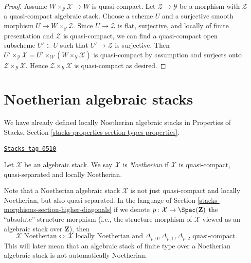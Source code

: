 \begin{proof}
Assume $W \times_\mathcal{Y} \mathcal{X} \to W$ is quasi-compact.
Let $\mathcal{Z} \to \mathcal{Y}$ be a morphism with $\mathcal{Z}$
a quasi-compact algebraic stack. Choose a scheme $U$ and a surjective
smooth morphism
$U \to W \times_\mathcal{Y} \mathcal{Z}$.
Since $U \to \mathcal{Z}$ is flat, surjective, and locally of finite
presentation and $\mathcal{Z}$ is quasi-compact, we can find a
quasi-compact open subscheme $U' \subset U$ such that
$U' \to \mathcal{Z}$ is surjective.
Then
$U' \times_\mathcal{Y} \mathcal{X} =
U' \times_W (W \times_\mathcal{Y} \mathcal{X})$
is quasi-compact by assumption and surjects onto
$\mathcal{Z} \times_\mathcal{Y} \mathcal{X}$.
Hence $\mathcal{Z} \times_\mathcal{Y} \mathcal{X}$
is quasi-compact as desired.
\end{proof}

\section{Noetherian algebraic stacks}
\label{stacks-morphisms-section-noetherian}
We have already defined locally Noetherian algebraic stacks in
Properties of Stacks, Section \ref{stacks-properties-section-types-properties}.

\begin{definition}[Noetherian]
\label{stacks-morphisms-definition-noetherian}
\href{https://stacks.math.columbia.edu/tag/0510}{\texttt{Stacks tag 0510}}

Let $\mathcal{X}$ be an algebraic stack. We say $\mathcal{X}$ is
{\it Noetherian} if $\mathcal{X}$ is quasi-compact, quasi-separated
and locally Noetherian.
\end{definition}

Note that a Noetherian algebraic stack $\mathcal{X}$ is not just quasi-compact
and locally Noetherian, but also quasi-separated. In the language of
Section \ref{stacks-morphisms-section-higher-diagonals}
if we denote $p : \mathcal{X} \to \Spec(\mathbf{Z})$ the
``absolute'' structure morphism (i.e., the structure morphism of
$\mathcal{X}$ viewed as an algebraic stack over $\mathbf{Z}$), then
$$
\mathcal{X}\text{ Noetherian}
\Leftrightarrow
\mathcal{X}\text{ locally Noetherian and }
\Delta_{p, 0}, \Delta_{p, 1}, \Delta_{p, 2}
\text{ quasi-compact}.
$$
This will later mean that an algebraic stack of finite type over a
Noetherian algebraic stack is not automatically Noetherian.

